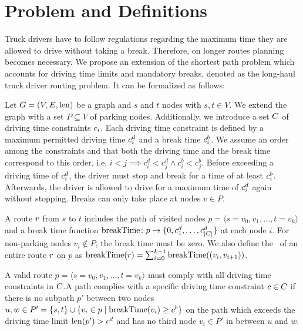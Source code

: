 
\chapter{Problem and Definitions}\label{chapter:problem_definitions}
Truck drivers have to follow regulations regarding the maximum time they are allowed to drive without taking a break. Therefore, on longer routes planning becomes necessary. We propose an extension of the shortest path problem which accounts for driving time limits and mandatory breaks, denoted as the long-haul truck driver routing problem. It can be formalized as follows:

Let $G=(V,E,\operatorname{len})$ be a graph and $s$ and $t$ nodes with $s,t \in V$. We extend the graph with a set $P \subseteq V$ of parking nodes. Additionally, we introduce a set $C$ of driving time constraints $c_i$. Each driving time constraint is defined by a maximum permitted driving time $c_i^d$ and a break time $c_i^b$. We assume an order among the constraints and that both the driving time and the break time correspond to this order, i.e. $i<j \implies c_i^d < c_j^d \wedge c_i^b < c_j^b$. Before exceeding a driving time of $c_i^d$, the driver must stop and break for a time of at least $c_i^b$. Afterwards, the driver is allowed to drive for a maximum time of $c_i^d$ again without stopping. Breaks can only take place at nodes $v \in P$.

A route $r$ from $s$ to $t$ includes the path of visited nodes $p = \langle s=v_0,v_1,\dots,t=v_k \rangle$ and a break time function $\operatorname{breakTime}\colon p \rightarrow \{0,c_1^d,\dots,c_{|C|}^d\}$ at each node $i$. For non-parking nodes $v_i \notin P$, the break time must be zero. We also define the \breakTime\ of an entire route $r$ on $p$ as $\operatorname{breakTime}(r) = \sum_{i=0}^{k-1}{\operatorname{breakTime}((v_i,v_{i+1}))}$.

\begin{definition}
	A valid route $p = \langle s=v_0,v_1,...,t=v_k \rangle$ must comply with all driving time constraints in $C$.A path complies with a specific driving time constraint $c \in C$ if there is no subpath $p'$ between two nodes $u,w \in P' = \{s,t\} \cup \{v_i \in p \mid \operatorname{breakTime}(v_i) \ge c^b\}$ on the path which exceeds the driving time limit $\operatorname{len}(p') > c^d$ and has no third node $v_i \in P'$ in between $u$ and $w$.
\end{definition}

